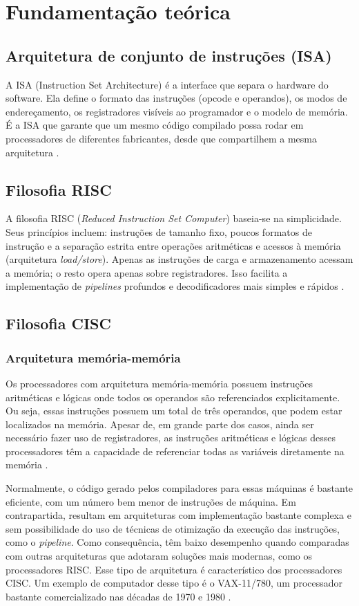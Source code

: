 \chapter{Fundamentação teórica}
\label{cap:fundamentacao}

\section{Arquitetura de conjunto de instruções (ISA)}
A ISA (Instruction Set Architecture) é a interface que separa o hardware do software. Ela define o formato das instruções (opcode e operandos), os modos de endereçamento, os registradores visíveis ao programador e o modelo de memória. É a ISA que garante que um mesmo código compilado possa rodar em processadores de diferentes fabricantes, desde que compartilhem a mesma arquitetura \cite{stallings2017}.

\section{Filosofia RISC}
A filosofia RISC (\textit{Reduced Instruction Set Computer}) baseia-se na simplicidade. Seus princípios incluem: instruções de tamanho fixo, poucos formatos de instrução e a separação estrita entre operações aritméticas e acessos à memória (arquitetura \textit{load/store}). Apenas as instruções de carga e armazenamento acessam a memória; o resto opera apenas sobre registradores. Isso facilita a implementação de \textit{pipelines} profundos e decodificadores mais simples e rápidos \cite{stallings2017}.

\section{Filosofia CISC}
\subsection{Arquitetura memória-memória}
Os processadores com arquitetura memória-memória possuem instruções aritméticas e lógicas onde todos os operandos são referenciados explicitamente. Ou seja, essas instruções possuem um total de três operandos, que podem estar localizados na memória. Apesar de, em grande parte dos casos, ainda ser necessário fazer uso de registradores, as instruções aritméticas e lógicas desses processadores têm a capacidade de referenciar todas as variáveis diretamente na memória \cite{silva2024}.

Normalmente, o código gerado pelos compiladores para essas máquinas é bastante eficiente, com um número bem menor de instruções de máquina. Em contrapartida, resultam em arquiteturas com implementação bastante complexa e sem possibilidade do uso de técnicas de otimização da execução das instruções, como o \textit{pipeline}. Como consequência, têm baixo desempenho quando comparadas com outras arquiteturas que adotaram soluções mais modernas, como os processadores RISC. Esse tipo de arquitetura é característico dos processadores CISC. Um exemplo de computador desse tipo é o VAX-11/780, um processador bastante comercializado nas décadas de 1970 e 1980 \cite{silva2024}.

